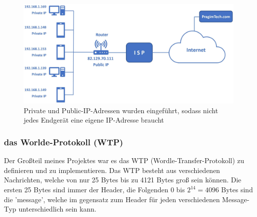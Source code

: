 \documentclass[a4paper]{article}
\begin{document}
                
                \begin{figure}[t]
                    \includegraphics[width=12cm]{images/public_private_networks.jpg}
                    \centering
                    \caption{Private und Public-IP-Adressen wurden eingeführt, sodass nicht jedes Endgerät eine eigene IP-Adresse braucht}
                \end{figure}
            
            \pagebreak
            \subsubsection{das Worlde-Protokoll (WTP)}
                Der Großteil meines Projektes war es das WTP (Wordle-Transfer-Protokoll) zu definieren und zu implementieren.
                Das WTP besteht aus verschiedenen Nachrichten, welche von nur 25 Bytes bis zu 4121 Bytes groß sein können. Die ersten 25 Bytes sind immer der Header, die Folgenden 0 bis $2^{14} = 4096$ Bytes sind die 'message', welche im gegensatz zum Header für jeden verschiedenen Message-Typ unterschiedlich sein kann. \\
            
                \vspace{10px}
                
                \noindent{}
                
\end{document}
